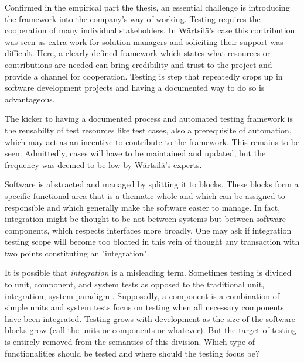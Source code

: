 \documentclass[12pt,a4paper,oneside,pdftex]{report}
\begin{document}
{%
Confirmed in the empirical part the thesis, an essential challenge is introducing the framework into the company's way of working. Testing requires the cooperation of many individual stakeholders. In Wärtsilä's case this contribution was seen as extra work for solution managers and soliciting their support was difficult. Here, a clearly defined framework which states what resources or contributions are needed can bring credibility and trust to the project and provide a channel for cooperation. Testing is step that repeatedly crops up in software development projects and having a documented way to do so is advantageous.

The kicker to having a documented process and automated testing framework is the reusabilty of test resources like test cases, also a prerequisite of automation, which may act as an incentive to contribute to the framework. This remains to be seen. Admittedly, cases will have to be maintained and updated, but the frequency was deemed to be low by Wärtsilä's experts.

Software is abstracted and managed by splitting it to blocks. These blocks form a specific functional area that is a thematic whole and which can be assigned to responsible and which generally make the software easier to manage. In fact, integration might be thought to be not between systems but between software components, which respects interfaces more broadly. One may ask if integration testing scope will become too bloated in this vein of thought any transaction with two points constituting an "integration".

It is possible that \emph{integration} is a misleading term. Sometimes testing is divided to unit, component, and system tests as opposed to the traditional unit, integration, system paradigm \citep{myers1976software, pezze2008software}. Supposedly, a component is a combination of simple units and system tests focus on testing when all necessary components have been integrated. Testing grows with development as the size of the software blocks grow (call the units or components or whatever). But the target of testing is entirely removed from the semantics of this division. Which type of functionalities should be tested and where should the testing focus be?


}
\end{document}
